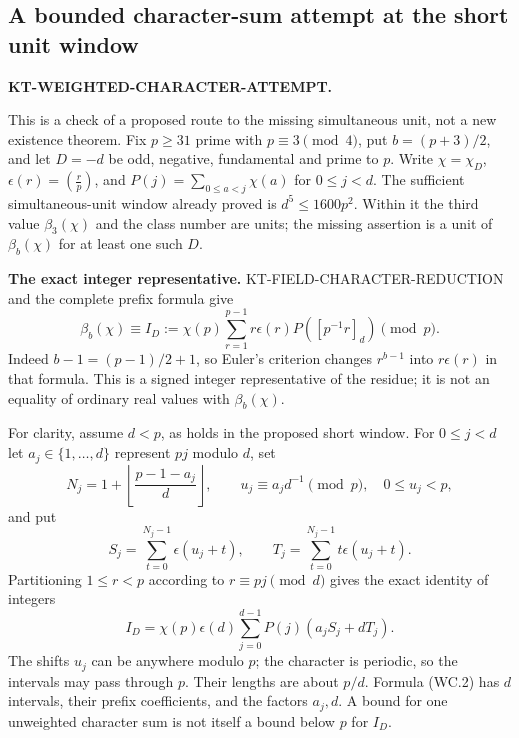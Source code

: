 \documentclass[11pt,a4paper]{article}
\theoremstyle{definition}
\renewcommand{\paragraph}[1]{\par\smallskip\noindent\textbf{#1}\quad\ignorespaces}
\begin{document}


\subsection{A bounded character-sum attempt at the short unit window}
\noindent\textbf{KT-WEIGHTED-CHARACTER-ATTEMPT.}\quad

This is a check of a proposed route to the missing simultaneous
unit, not a new existence theorem.  Fix $p\geq31$ prime with
$p\equiv3\pmod4$, put $b=(p+3)/2$, and let $D=-d$ be odd,
negative, fundamental and prime to $p$.  Write
$\chi=\chi_D$, $\epsilon(r)=(\frac rp)$, and
$P(j)=\sum_{0\leq a<j}\chi(a)$ for $0\leq j<d$.
The sufficient simultaneous-unit window already proved is
$d^5\leq1600p^2$.  Within it the third value $\beta_3(\chi)$
and the class number are units; the missing assertion is a
unit of $\beta_b(\chi)$ for at least one such $D$.

\paragraph{The exact integer representative.}
KT-FIELD-CHARACTER-REDUCTION and the complete prefix formula give
\[
 \beta_b(\chi)\equiv I_D
 :=\chi(p)\sum_{r=1}^{p-1}r\epsilon(r)
                         P([p^{-1}r]_d)\pmod p.
 \tag{WC.1}
\]
Indeed $b-1=(p-1)/2+1$, so Euler's criterion changes
$r^{b-1}$ into $r\epsilon(r)$ in that formula.
This is a signed integer representative of the residue;
it is not an equality of ordinary real values with
$\beta_b(\chi)$.

For clarity, assume $d<p$, as holds in the proposed short
window.  For $0\leq j<d$ let $a_j\in\{1,\ldots,d\}$
represent $pj$ modulo $d$, set
\[
 N_j=1+\left\lfloor\frac{p-1-a_j}{d}\right\rfloor,
 \qquad u_j\equiv a_jd^{-1}\pmod p,
 \quad 0\leq u_j<p,
\]
and put
\[
 S_j=\sum_{t=0}^{N_j-1}\epsilon(u_j+t),\qquad
 T_j=\sum_{t=0}^{N_j-1}t\epsilon(u_j+t).
\]
Partitioning $1\leq r<p$ according to $r\equiv pj\pmod d$
gives the exact identity of integers
\[
 I_D=\chi(p)\epsilon(d)
        \sum_{j=0}^{d-1}P(j)(a_jS_j+dT_j).
 \tag{WC.2}
\]
The shifts $u_j$ can be anywhere modulo $p$; the character
is periodic, so the intervals may pass through $p$.
Their lengths are about $p/d$.  Formula (WC.2) has
$d$ intervals, their prefix coefficients, and the factors
$a_j,d$.  A bound for one unweighted character sum is
not itself a bound below $p$ for $I_D$.
\end{document}
